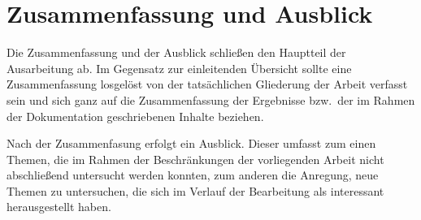 \section{Zusammenfassung und Ausblick%
         \label{sec:zusammen}}

Die Zusammenfassung und der Ausblick schließen den Hauptteil der Ausarbeitung ab. 
Im Gegensatz zur einleitenden Übersicht sollte eine Zusammenfassung losgelöst
von der tatsächlichen Gliederung der Arbeit verfasst sein und sich ganz auf die
Zusammenfassung der Ergebnisse bzw.\ der im Rahmen der Dokumentation
geschriebenen Inhalte beziehen. 

Nach der Zusammenfasung erfolgt ein Ausblick. 
Dieser umfasst zum einen Themen, die im Rahmen der Beschränkungen der
vorliegenden Arbeit nicht abschließend untersucht werden konnten,
zum anderen die Anregung, neue Themen zu untersuchen, die sich im Verlauf der
Bearbeitung als interessant herausgestellt haben. 
